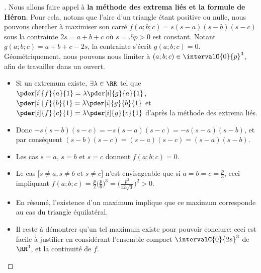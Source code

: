 \begin{proof}[] \label{constrained-extrema}
	Nous allons faire appel à \textbf{la méthode des extrema liés et la formule de Héron}.
	Pour cela, notons que l'aire d'un triangle étant positive ou nulle, nous pouvons chercher à maximiser son carré
	$f(a;b;c) = s(s - a)(s - b)(s - c)$
	sous la contrainte $2s = a + b + c$ où $s = \num{.5} p > 0$ est constant.
	Notant $g(a;b;c) = a + b + c - 2 s$, la contrainte s'écrit $g(a;b;c) = 0$.
	Géométriquement, nous pouvons nous limiter à $(a;b;c) \in \intervalO{0}{p}^3$, afin de travailler dans un ouvert.
	\begin{itemize}
		\item Si un extremum existe,
    	$\exists \lambda \in \RR$ tel que
    	$\pder[i]{f}{a}{1} = \lambda \pder[i]{g}{a}{1}$,
    	$\pder[i]{f}{b}{1} = \lambda \pder[i]{g}{b}{1}$ et
    	$\pder[i]{f}{c}{1} = \lambda \pder[i]{g}{c}{1}$
		d'après la méthode des extrema liés.

		\item Donc
		$- s(s - b)(s - c) = - s(s - a)(s - c) = - s(s - a)(s - b)$,
		et par conséquent
		$(s - b)(s - c) = (s - a)(s - c) = (s - a)(s - b)$.

		\item Les cas $s = a$, $s = b$ et $s = c$ donnent $f(a;b;c) = 0$.

		\item Le cas $\big[ s \neq a, s \neq b \text{ et } s \neq c \big]$ n'est envisageable que si $a = b = c = \frac{p}{3}$, ceci impliquant $f(a;b;c) = \frac{p}{2} \big( \frac{p}{6} \big)^3 = \big( \frac{p^2}{12 \sqrt{3}} \big)^2 > 0$.

		\item En résumé, l'existence d'un maximum implique que ce maximum corresponde au cas du triangle équilatéral.

		\item Il reste à démontrer qu'un tel maximum existe pour pouvoir conclure: ceci est facile à justifier en considérant l'ensemble compact $\intervalC{0}{2s}^3$ de $\RR^3$, et la continuité de $f$.
	\end{itemize}
	
	\null\vspace{-6ex}
\end{proof}

